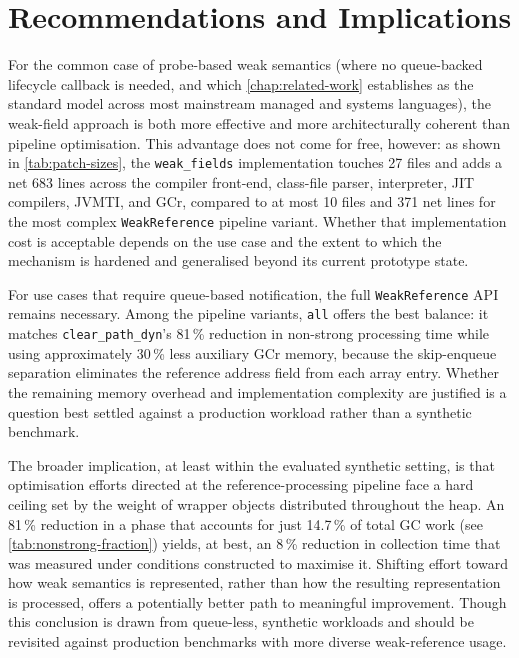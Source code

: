 \section{Recommendations and Implications}
\label{sec:conc-overall}

For the common case of probe-based weak semantics (where no queue-backed lifecycle callback is needed, and which \cref{chap:related-work} establishes as the standard model across most mainstream managed and systems languages), the weak-field approach is both more effective and more architecturally coherent than pipeline optimisation. This advantage does not come for free, however: as shown in \cref{tab:patch-sizes}, the \texttt{weak\_fields} implementation touches 27 files and adds a net 683 lines across the compiler front-end, class-file parser, interpreter, \ac{JIT} compilers, JVMTI, and \ac{GCr}, compared to at most 10 files and 371 net lines for the most complex \texttt{WeakReference} pipeline variant. Whether that implementation cost is acceptable depends on the use case and the extent to which the mechanism is hardened and generalised beyond its current prototype state.

For use cases that require queue-based notification, the full \texttt{WeakReference} \ac{API} remains necessary. Among the pipeline variants, \texttt{all} offers the best balance: it matches \texttt{clear\_path\_dyn}'s 81\,\% reduction in non-strong processing time while using approximately 30\,\% less auxiliary \ac{GCr} memory, because the skip-enqueue separation eliminates the reference address field from each array entry. Whether the remaining memory overhead and implementation complexity are justified is a question best settled against a production workload rather than a synthetic benchmark.

The broader implication, at least within the evaluated synthetic setting, is that optimisation efforts directed at the reference-processing pipeline face a hard ceiling set by the weight of wrapper objects distributed throughout the heap. An 81\,\% reduction in a phase that accounts for just 14.7\,\% of total \ac{GC} work (see \cref{tab:nonstrong-fraction}) yields, at best, an 8\,\% reduction in collection time that was measured under conditions constructed to maximise it. Shifting effort toward how weak semantics is represented, rather than how the resulting representation is processed, offers a potentially better path to meaningful improvement. Though this conclusion is drawn from queue-less, synthetic workloads and should be revisited against production benchmarks with more diverse weak-reference usage.

